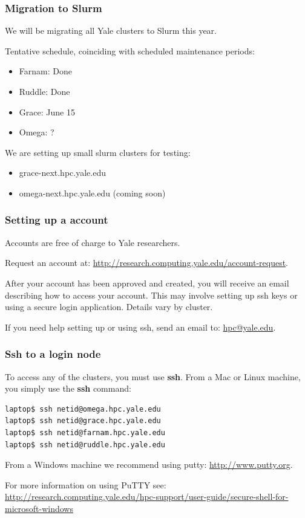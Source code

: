 \documentclass[10pt]{beamer}
\begin{document}
\begin{frame}[fragile]
\frametitle{Migration to Slurm}
We will be migrating all Yale clusters to Slurm this year.    

Tentative schedule, coinciding with scheduled maintenance periods:
\begin{itemize}
\item Farnam: Done
\item Ruddle: Done
\item Grace: June 15
\item Omega: ? 
\end{itemize}

We are setting up small slurm clusters for testing:
\begin{itemize}
\item grace-next.hpc.yale.edu
\item omega-next.hpc.yale.edu (coming soon)
\end{itemize}
\end{frame}

\begin{frame}[fragile]
\frametitle{Setting up a account}

Accounts are free of charge to Yale researchers.
\vskip10pt

Request an account at: \url{http://research.computing.yale.edu/account-request}.

\vskip10pt
After your account has been approved and created, you will receive
an email describing how to access your account.  This may involve setting up ssh keys or 
using a secure login application.  Details vary by cluster.

\vskip10pt
If you need help setting up or using ssh, send an email to: \url{hpc@yale.edu}.
\end{frame}

\begin{frame}[fragile]
\frametitle{Ssh to a login node}
To access any of the clusters, you must use \textbf{ssh}.
From a Mac or Linux machine, you simply use the \textbf{ssh} command:

\begin{verbatim}
laptop$ ssh netid@omega.hpc.yale.edu
laptop$ ssh netid@grace.hpc.yale.edu
laptop$ ssh netid@farnam.hpc.yale.edu
laptop$ ssh netid@ruddle.hpc.yale.edu
\end{verbatim}

From a Windows machine we recommend using putty: \url{http://www.putty.org}.

\vskip10pt
For more information on using PuTTY see:
\url{http://research.computing.yale.edu/hpc-support/user-guide/secure-shell-for-microsoft-windows}
\end{frame}
\end{document}
